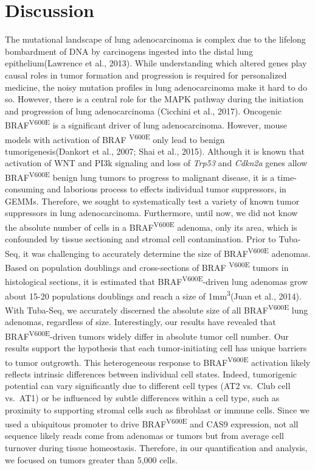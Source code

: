 \hypertarget{discussion}{%
\section{Discussion}\label{discussion}}

The mutational landscape of lung adenocarcinoma is complex due to the lifelong bombardment of DNA by carcinogens ingested into the distal lung epithelium(Lawrence et al., 2013).
While understanding which altered genes play causal roles in tumor formation and progression is required for personalized medicine, the noisy mutation profiles in lung adenocarcinoma make it hard to do so.
However, there is a central role for the MAPK pathway during the initiation and progression of lung adenocarcinoma (Cicchini et al., 2017).
Oncogenic BRAF\textsuperscript{V600E} is a significant driver of lung adenocarcinoma.
However, mouse models with activation of BRAF \textsuperscript{V600E} only lead to benign tumorigenesis(Dankort et al., 2007; Shai et al., 2015).
Although it is known that activation of WNT and PI3k signaling and loss of \emph{Trp53} and \emph{Cdkn2a} genes allow BRAF\textsuperscript{V600E} benign lung tumors to progress to malignant disease, it is a time-consuming and laborious process to effects individual tumor suppressors, in GEMMs.
Therefore, we sought to systematically test a variety of known tumor suppressors in lung adenocarcinoma.
Furthermore, until now, we did not know the absolute number of cells in a BRAF\textsuperscript{V600E} adenoma, only its area, which is confounded by tissue sectioning and stromal cell contamination.
Prior to Tuba-Seq, it was challenging to accurately determine the size of BRAF\textsuperscript{V600E} adenomas.
Based on population doublings and cross-sections of BRAF \textsuperscript{V600E} tumors in histological sections, it is estimated that BRAF\textsuperscript{V600E}-driven lung adenomas grow about 15-20 populations doublings and reach a size of 1mm\textsuperscript{3}(Juan et al., 2014).
With Tuba-Seq, we accurately discerned the absolute size of all BRAF\textsuperscript{V600E} lung adenomas, regardless of size.
Interestingly, our results have revealed that BRAF\textsuperscript{V600E}-driven tumors widely differ in absolute tumor cell number. Our results support the hypothesis that each tumor-initiating cell has unique barriers to tumor outgrowth.
This heterogeneous response to BRAF\textsuperscript{V600E} activation likely reflects intrinsic differences between individual cell states.
Indeed, tumorigenic potential can vary significantly due to different cell types (AT2 vs.~Club cell vs.~AT1) or be influenced by subtle differences within a cell type, such as proximity to supporting stromal cells such as fibroblast or immune cells.
Since we used a ubiquitous promoter to drive BRAF\textsuperscript{V600E} and CAS9 expression, not all sequence likely reads come from adenomas or tumors but from average cell turnover during tissue homeostasis.
Therefore, in our quantification and analysis, we focused on tumors greater than 5,000 cells.

